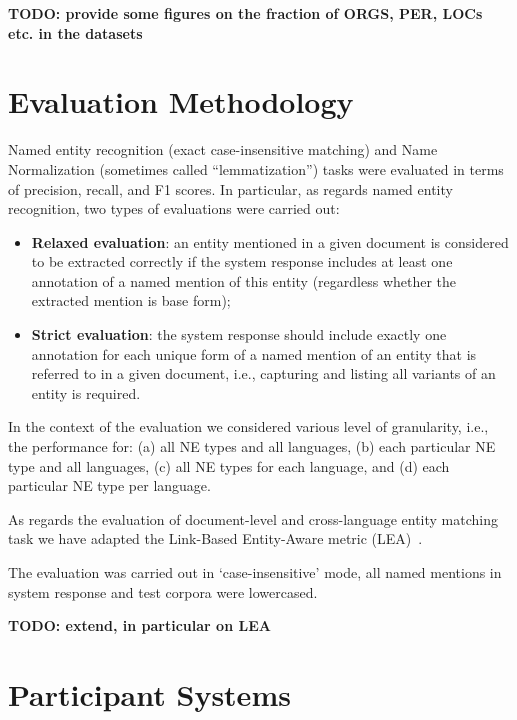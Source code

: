 \documentclass[11pt]{article}
\begin{document}
\textbf{TODO: provide some figures on the fraction of ORGS, PER, LOCs etc. in the datasets}

\section{Evaluation Methodology}
\label{sec:evaluation}

Named entity recognition (exact case-insensitive matching) and  Name Normalization (sometimes called “lemmatization”) tasks were evaluated in terms of precision, recall, and F1 scores. In particular, as regards named entity recognition, two types of evaluations were carried out:

\begin{itemize}

\item \textbf{Relaxed evaluation}: an entity mentioned in a given document is considered to be extracted correctly if the system response includes at least one annotation of a named mention of this entity (regardless whether the extracted mention is base form);

\item \textbf{Strict evaluation}: the system response should include exactly one annotation for each unique form of a named mention of an entity that is referred to in a given document, i.e., capturing and listing all variants of an entity is required.

\end{itemize}

In the context of the evaluation we considered various level of granularity, i.e., the performance for: 
(a) all NE types and all languages, (b) each particular NE type and all languages, (c) all NE types for each language,
and (d) each particular NE type per language. 

As regards the evaluation of document-level and cross-language entity matching task we have adapted the 
Link-Based Entity-Aware metric (LEA)~\cite{DBLP:conf-acl-Moosavi016}.

The evaluation was carried out in `case-insensitive' mode, all named mentions in system response and test corpora were 
lowercased.

\textbf{TODO: extend, in particular on LEA}

\section{Participant Systems}
\label{sec:participants}
\end{document}
